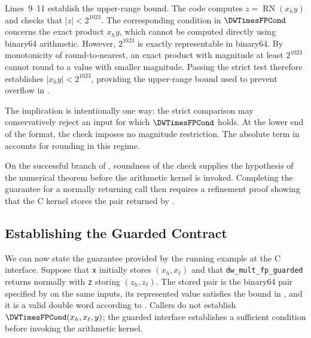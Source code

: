 Lines~9--11 establish the upper-range bound.  The code computes
$z=\operatorname{RN}(x_hy)$ and checks that $|z|<2^{1023}$.  The corresponding
condition in $\DWTimesFPCond$ concerns the exact product $x_hy$, which cannot
be computed directly using binary64 arithmetic.  However, $2^{1023}$ is
exactly representable in binary64.  By monotonicity of round-to-nearest, an
exact product with magnitude at least $2^{1023}$ cannot round to a value with
smaller magnitude.  Passing the strict test therefore establishes
$|x_hy|<2^{1023}$, providing the upper-range bound used to prevent overflow
in \DWTimesFP{}.

The implication is intentionally one way: the strict comparison may
conservatively reject an input for which $\DWTimesFPCond$ holds.  At the lower
end of the format, the check imposes no magnitude restriction.  The absolute
term in  accounts for rounding in this regime.

On the successful branch of , soundness of the check
supplies the hypothesis of the numerical theorem before the arithmetic
kernel is invoked.  Completing the guarantee for a normally returning call
then requires a refinement proof showing that the C kernel stores the pair
returned by \DWTimesFP{}.

\subsection{Establishing the Guarded Contract}
\label{sec:overview-pipeline}

We can now state the guarantee provided by the running example at the C
interface.  Suppose that \texttt{x} initially stores $(x_h,x_\ell)$ and that
\texttt{dw\_mult\_fp\_guarded} returns normally with \texttt{z} storing
$(z_h,z_\ell)$.  The stored pair is the binary64 pair specified by
\DWTimesFP{} on the same inputs, its represented value satisfies the bound in
, and it is a valid double word according to
.  Callers do not establish
$\DWTimesFPCond(x_h,x_\ell,y)$; the guarded interface establishes a sufficient
condition before invoking the arithmetic kernel.

\newcommand{\diagramboxtitle}[1]{%
  \makebox[\linewidth][c]{{\normalsize\textbf{#1}}}}

